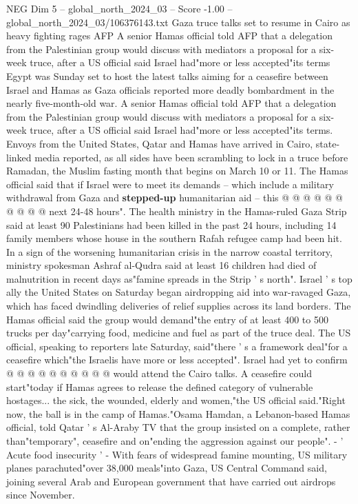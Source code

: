 \begin{textsample}{NEG Dim 5 – global\_north\_2024\_03 – Score -1.00 – global\_north\_2024\_03/106376143.txt}  \label{ex:f5_neg_082}
Gaza truce talks set to resume in Cairo as heavy fighting rages AFP A senior Hamas official told AFP that a delegation from the Palestinian group would discuss with mediators a proposal for a six-week truce, after a US official said Israel had"more or less accepted"its terms Egypt was Sunday set to host the latest talks aiming for a ceasefire between Israel and Hamas as Gaza officials reported more deadly bombardment in the nearly five-month-old war.
A senior Hamas official told AFP that a delegation from the Palestinian group would discuss with mediators a proposal for a six-week truce, after a US official said Israel had"more or less accepted"its terms.
Envoys from the United States, Qatar and Hamas have arrived in Cairo, state-linked media reported, as all sides have been scrambling to lock in a truce before Ramadan, the Muslim fasting month that begins on March 10 or 11.
The Hamas official said that if Israel were to meet its demands -- which include a military withdrawal from Gaza and \textbf{stepped-up} humanitarian aid -- this @ @ @ @ @ @ @ @ @ @ next 24-48 hours".
The health ministry in the Hamas-ruled Gaza Strip said at least 90 Palestinians had been killed in the past 24 hours, including 14 family members whose house in the southern Rafah refugee camp had been hit.
In a sign of the worsening humanitarian crisis in the narrow coastal territory, ministry spokesman Ashraf al-Qudra said at least 16 children had died of malnutrition in recent days as"famine spreads in the Strip ' s north".
Israel ' s top ally the United States on Saturday began airdropping aid into war-ravaged Gaza, which has faced dwindling deliveries of relief supplies across its land borders.
The Hamas official said the group would demand"the entry of at least 400 to 500 trucks per day"carrying food, medicine and fuel as part of the truce deal.
The US official, speaking to reporters late Saturday, said"there ' s a framework deal"for a ceasefire which"the Israelis have more or less accepted".
Israel had yet to confirm @ @ @ @ @ @ @ @ @ @ would attend the Cairo talks.
A ceasefire could start"today if Hamas agrees to release the defined category of vulnerable hostages... the sick, the wounded, elderly and women,"the US official said."Right now, the ball is in the camp of Hamas."Osama Hamdan, a Lebanon-based Hamas official, told Qatar ' s Al-Araby TV that the group insisted on a complete, rather than"temporary", ceasefire and on"ending the aggression against our people". - ' Acute food insecurity ' - With fears of widespread famine mounting, US military planes parachuted"over 38,000 meals"into Gaza, US Central Command said, joining several Arab and European government that have carried out airdrops since November.

\end{textsample}
